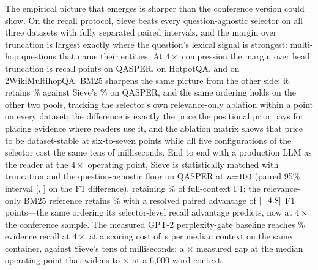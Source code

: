 \documentclass[preprint,12pt]{elsarticle}
\DeclarePairedDelimiter\abs{\lvert}{\rvert}
\theoremstyle{remark}
\newcommand{\method}{Sieve}
\begin{document}
The empirical picture that emerges is sharper than the conference
version could show. On the recall protocol, \method{} beats every
question-agnostic selector on all three datasets with fully separated
paired intervals, and the margin over truncation is largest exactly
where the question's lexical signal is strongest: multi-hop questions
that name their entities. At $4\times$ compression the margin over
head truncation is \PairQSH{} recall points on QASPER, \PairHSH{} on
HotpotQA, and \PairWSH{} on 2WikiMultihopQA. BM25 sharpens the same
picture from the other side: it retains \RecQBm\% against
\method{}'s \RecQSie\% on QASPER, and the same ordering holds on the
other two pools, tracking the selector's own relevance-only ablation
within a point on every dataset; the difference is exactly the price
the positional prior pays for placing evidence where readers use it,
and the ablation matrix shows that price to be dataset-stable at
six-to-seven points while all five configurations of the selector
cost the same tens of milliseconds.
End to end with a production LLM as the reader at the $4\times$
operating point, \method{} is statistically matched with truncation
and the question-agnostic floor on QASPER at $n{=}100$ (paired 95\%
interval [\QAPairSHLo, \QAPairSHHi] on the F1 difference), retaining
\QASieRetain\% of full-context F1; the relevance-only BM25 reference
retains \QABmRetain\% with a resolved paired advantage of
$\abs{\QAPairSBm}$ F1 points---the same ordering its selector-level
recall advantage predicts, now at $4\times$ the conference sample. The
measured GPT-2
perplexity-gate baseline reaches \GateRecall\% evidence recall at
$4\times$ at a scoring cost of \GateLatMedCtxS\,s per median context
on the same container, against \method{}'s tens of milliseconds: a
\GateSieRatioMed$\times$ measured gap at the median operating point
that widens to \GateSieRatioSixk$\times$ at a 6{,}000-word context.
\end{document}
